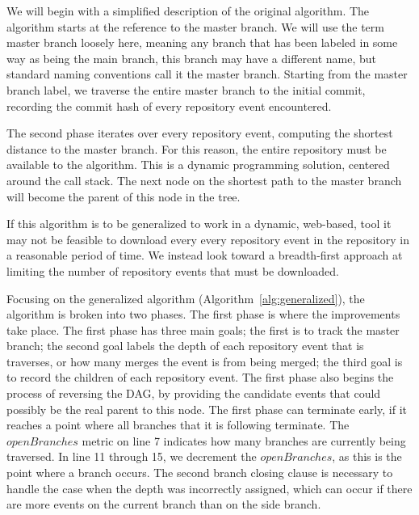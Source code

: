 We will begin with a simplified description of the original algorithm.
The algorithm starts at the reference to the master branch. We will use
the term master branch loosely here, meaning any branch that has been
labeled in some way as being the main branch, this branch may have a
different name, but standard naming conventions call it the master
branch. Starting from the master branch label, we traverse the entire
master branch to the initial commit, recording the commit hash of every
repository event encountered.

The second phase iterates over every repository event, computing the
shortest distance to the master branch. For this reason, the entire
repository must be available to the algorithm. This is a dynamic
programming solution, centered around the call stack. The next node on
the shortest path to the master branch will become the parent of this
node in the tree.

If this algorithm is to be generalized to work in a dynamic, web-based,
tool it may not be feasible to download every every repository event in the
repository in a reasonable period of time. We instead look toward a
breadth-first approach at limiting the number of repository events that
must be downloaded.

Focusing on the generalized algorithm (Algorithm~\ref{alg:generalized}),
the algorithm is broken into two phases. The first phase is where the
improvements take place. The first phase has three main goals; the first
is to track the master branch; the second goal labels the depth of each
repository event that is traverses, or how many merges the event is from
being merged; the third goal is to record the children of each
repository event. The first phase also begins the process of reversing
the DAG, by providing the candidate events that could possibly be the
real parent to this node. The first phase can terminate early, if it
reaches a point where all branches that it is following terminate. The
$openBranches$ metric on line 7 indicates how many branches are
currently being traversed. In line 11 through 15, we decrement the
$openBranches$, as this is the point where a branch occurs. The second
branch closing clause is necessary to handle the case when the depth was
incorrectly assigned, which can occur if there are more events on the
current branch than on the side branch.

